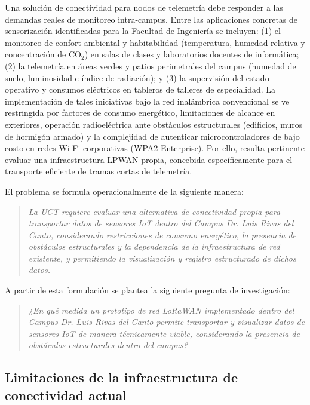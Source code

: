 \documentclass[12pt,oneside,openany,spanish,oldfontcommands]{memoir}
\begin{document}
Una solución de conectividad para nodos de telemetría debe responder a las demandas
reales de monitoreo intra-campus. Entre las aplicaciones concretas de sensorización
identificadas para la Facultad de Ingeniería se incluyen: (1) el monitoreo de confort
ambiental y habitabilidad (temperatura, humedad relativa y concentración de $\text{CO}_2$)
en salas de clases y laboratorios docentes de informática; (2) la telemetría en áreas verdes
y patios perimetrales del campus (humedad de suelo, luminosidad e índice de radiación); y
(3) la supervisión del estado operativo y consumos eléctricos en tableros de talleres de
especialidad. La implementación de tales iniciativas bajo la red inalámbrica convencional se ve
restringida por factores de consumo energético, limitaciones de alcance en exteriores, operación
radioeléctrica ante obstáculos estructurales (edificios, muros de hormigón armado) y la
complejidad de autenticar microcontroladores de bajo costo en redes Wi-Fi corporativas
(WPA2-Enterprise). Por ello, resulta pertinente evaluar una infraestructura LPWAN propia,
concebida específicamente para el transporte eficiente de tramas cortas de telemetría.

El problema se formula operacionalmente de la siguiente manera:

\begin{quote}
\textit{
La UCT requiere evaluar una alternativa de conectividad propia para transportar datos de
sensores IoT dentro del Campus Dr. Luis Rivas del Canto, considerando restricciones de
consumo energético, la presencia de obstáculos estructurales y la dependencia de la
infraestructura de red existente, y permitiendo la visualización y registro estructurado de
dichos datos.
}
\end{quote}

A partir de esta formulación se plantea la siguiente pregunta de investigación:

\begin{quote}
\textit{
¿En qué medida un prototipo de red LoRaWAN implementado dentro del Campus Dr. Luis Rivas
del Canto permite transportar y visualizar datos de sensores IoT de manera técnicamente
viable, considerando la presencia de obstáculos estructurales dentro del campus?
}
\end{quote}

\subsection{Limitaciones de la infraestructura de conectividad actual}
\label{sec:limitaciones-infra}
\end{document}
